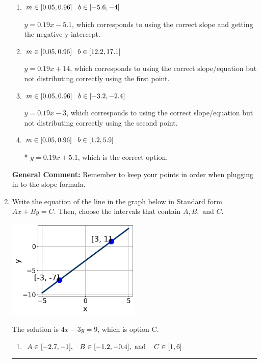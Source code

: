 \documentclass{extbook}[14pt]
\newcommand{\litem}[1]{\item #1

\rule{\textwidth}{0.4pt}}
\begin{document}
\begin{enumerate}
{\begin{enumerate}[label=\Alph*.]
 $y = -0.19x + 8.9$, which corresponds to using the negative slope and the correct equation.
\item \( m \in [0.05, 0.96] \hspace*{3mm} b \in [-5.6, -4] \)

 $y = 0.19x -5.1$, which corresponds to using the correct slope and getting the negative y-intercept.
\item \( m \in [0.05, 0.96] \hspace*{3mm} b \in [12.2, 17.1] \)

 $y = 0.19x + 14$, which corresponds to using the correct slope/equation but not distributing correctly using the first point.
\item \( m \in [0.05, 0.96] \hspace*{3mm} b \in [-3.2, -2.4] \)

 $y = 0.19x -3$, which corresponds to using the correct slope/equation but not distributing correctly using the second point.
\item \( m \in [0.05, 0.96] \hspace*{3mm} b \in [1.2, 5.9] \)

* $y = 0.19x + 5.1$, which is the correct option.
\end{enumerate}

\textbf{General Comment:} Remember to keep your points in order when plugging in to the slope formula.
}
\litem{
Write the equation of the line in the graph below in Standard form $Ax+By=C$. Then, choose the intervals that contain $A, B, \text{ and } C$.

\begin{center}
    \includegraphics[width=0.5\textwidth]{../Figures/linearGraphToStandardCopyB.png}
\end{center}


The solution is \( 4x - 3y = 9 \), which is option C.\begin{enumerate}[label=\Alph*.]
\item \( A \in [-2.7, -1], \hspace{3mm} B \in [-1.2, -0.4], \text{ and } \hspace{3mm} C \in [1, 6] \)


\end{enumerate}}
\end{enumerate}
\end{document}
